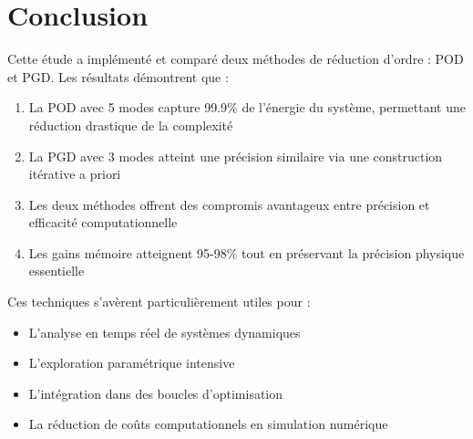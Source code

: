 \documentclass{rapportECL}
\begin{document}
\section{Conclusion}
Cette étude a implémenté et comparé deux méthodes de réduction d'ordre : POD et PGD. Les résultats démontrent que :
\begin{enumerate}
    \item La POD avec 5 modes capture 99.9\% de l'énergie du système, permettant une réduction drastique de la complexité
    \item La PGD avec 3 modes atteint une précision similaire via une construction itérative a priori
    \item Les deux méthodes offrent des compromis avantageux entre précision et efficacité computationnelle
    \item Les gains mémoire atteignent 95-98\% tout en préservant la précision physique essentielle
\end{enumerate}

Ces techniques s'avèrent particulièrement utiles pour :
\begin{itemize}
    \item L'analyse en temps réel de systèmes dynamiques
    \item L'exploration paramétrique intensive
    \item L'intégration dans des boucles d'optimisation
    \item La réduction de coûts computationnels en simulation numérique
\end{itemize}

\end{document}
